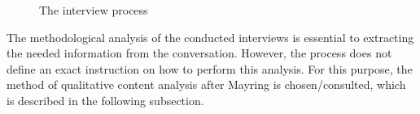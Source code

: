 \begin{figure}
    \centering
    
    \caption[The interview process]{The interview process\protect\footnotemark}
    \label{fig:InterviewProcess}
\end{figure}


The methodological analysis of the conducted interviews is essential to extracting the needed information from the conversation. However, the process does not define an exact instruction on how to perform this analysis. For this purpose, the method of qualitative content analysis after Mayring is chosen/consulted, which is described in the following subsection.

